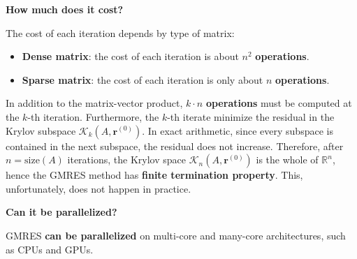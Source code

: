 \newpage

\begin{flushleft}
    \textcolor{Red2}{ \textbf{How much does it cost?}}
\end{flushleft}
The cost of each iteration depends by type of matrix:
\begin{itemize}
    \item \textbf{Dense matrix}: the cost of each iteration is about $n^{2}$ \textbf{operations}.
    \item \textbf{Sparse matrix}: the cost of each iteration is only about $n$ \textbf{operations}.
\end{itemize}
In addition to the matrix-vector product, $k \cdot n$ \textbf{operations} must be computed at the $k$-th iteration. Furthermore, the $k$-th iterate minimize the residual in the Krylov subspace $\mathcal{K}_{k}\left(A, \mathbf{r}^{\left(0\right)}\right)$. In exact arithmetic, since every subspace is contained in the next subspace, the residual does not increase. Therefore, after $n = \mathrm{size}\left(A\right)$ iterations, the Krylov space $\mathcal{K}_{n}\left(A, \mathbf{r}^{\left(0\right)}\right)$ is the whole of $\mathbb{R}^{n}$, hence the GMRES method has \textbf{finite termination property}. This, unfortunately, does not happen in practice.

\highspace
\begin{flushleft}
    \textcolor{Green3}{ \textbf{Can it be parallelized?}}
\end{flushleft}
GMRES \textbf{can be parallelized} on multi-core and many-core architectures, such as CPUs and GPUs.